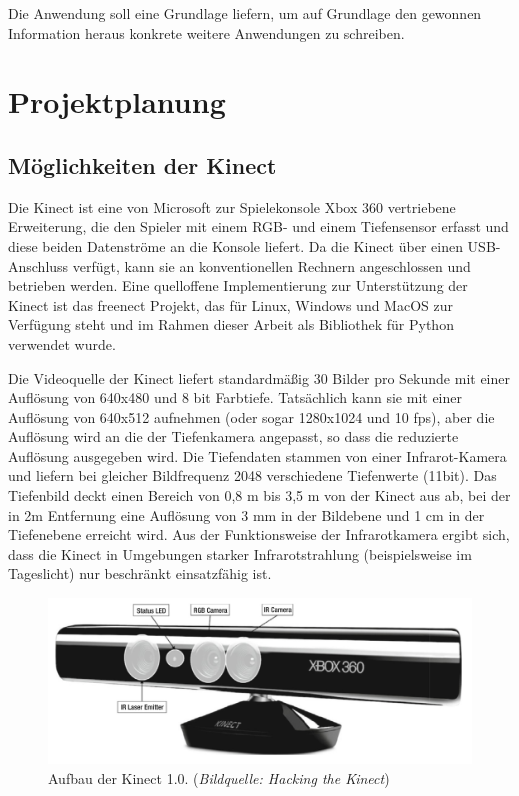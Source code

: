\documentclass[12pt,a4paper,ngerman]{scrartcl}
\begin{document}
Die Anwendung soll eine Grundlage liefern, um auf Grundlage den gewonnen Information
heraus konkrete weitere Anwendungen zu schreiben.


\section{Projektplanung}

\subsection{Möglichkeiten der Kinect}
\label{sec:kinect}

Die Kinect ist eine von Microsoft zur Spielekonsole Xbox 360 vertriebene Erweiterung,
die den Spieler mit einem RGB- und einem Tiefensensor erfasst und diese beiden
Datenströme an die Konsole liefert. Da die Kinect über einen USB-Anschluss verfügt,
kann sie an konventionellen Rechnern angeschlossen und betrieben werden. Eine
quelloffene Implementierung zur Unterstützung der Kinect ist das freenect Projekt,
das für Linux, Windows und MacOS zur Verfügung steht und im Rahmen dieser Arbeit
als Bibliothek für Python verwendet wurde.\cite{openkinect}\cite{libfreenect}

Die Videoquelle der Kinect liefert standardmäßig 30 Bilder pro Sekunde mit einer
Auflösung von 640x480 und 8 bit Farbtiefe. Tatsächlich kann sie mit
einer Auflösung von 640x512 aufnehmen (oder sogar 1280x1024 und 10 fps), aber die
Auflösung wird an die der Tiefenkamera angepasst, so dass die reduzierte Auflösung
ausgegeben wird. Die Tiefendaten stammen von einer
Infrarot-Kamera und liefern bei gleicher Bildfrequenz 2048 verschiedene
Tiefenwerte (11bit). Das Tiefenbild deckt einen Bereich von 0,8 m bis 3,5 m von der
Kinect aus ab, bei der in 2m Entfernung eine Auflösung von 3 mm in der Bildebene und
1 cm in der Tiefenebene erreicht wird. Aus der Funktionsweise der Infrarotkamera
ergibt sich, dass die Kinect in Umgebungen starker Infrarotstrahlung (beispielsweise
im Tageslicht) nur beschränkt einsatzfähig ist.\cite{hacking}

\begin{figure}[H]
    \centering
    \includegraphics[scale=0.33]{img/kinect_components.jpg}
    \caption{Aufbau der Kinect 1.0. ({\em Bildquelle: Hacking the Kinect\cite{hacking}})}
\end{figure}
\end{document}
